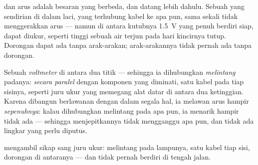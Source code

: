 \begin{proposition}\label{prop:g8:voltage-voltmeter:nocurrent}
 dan arus adalah besaran yang berbeda, dan  datang
lebih dahulu. Sebuah  yang sendirian di dalam laci, yang
terhubung kabel ke apa pun, sama sekali tidak menggerakkan arus ---
namun di antara kutubnya \qty{1.5}{V} yang penuh berdiri siap, dapat
diukur, seperti tinggi sebuah air terjun pada hari kincirnya tutup.
Dorongan dapat ada tanpa arak-arakan; arak-arakannya tidak pernah ada
tanpa dorongan.
\end{proposition}

\begin{definition}[Voltmeter]\label{def:g8:voltage-voltmeter:voltmeter}
Sebuah \emph{voltmeter}   di antara
dua titik --- sehingga ia dihubungkan \emph{melintang} padanya:
\emph{secara paralel} dengan komponen yang diminati, satu kabel pada
tiap sisinya, seperti juru ukur yang memegang alat datar di antara dua
ketinggian. Karena dibangun berlawanan dengan  dalam
segala hal, ia melawan arus hampir \emph{sepenuhnya}: kalau
dihubungkan melintang pada apa pun, ia menarik hampir tidak ada ---
sehingga menjepitkannya tidak mengganggu apa pun, dan tidak ada
lingkar yang perlu diputus.
\end{definition}

\begin{omfigure}

{\small {} mengambil sikap sang juru ukur: melintang pada
lampunya, satu kabel tiap sisi,  dorongan di antaranya --- dan
tidak pernah berdiri di tengah jalan.}
\end{omfigure}


